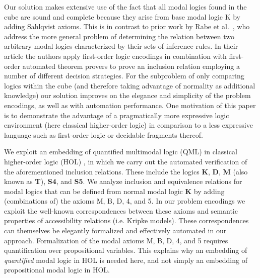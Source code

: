 \begin{isabellebody}
\begin{isamarkuptext}
Our solution makes extensive use of the fact that all modal logics found in the cube
are sound and complete because they arise from base modal logic K by adding Sahlqvist axioms.
This is in contrast to prior work by Rabe et al.~\cite{Rabe}, who address the more general problem of determining the
relation between two arbitrary modal logics characterized by their sets of inference
rules. In their article the authors apply first-order logic encodings in combination with first-order
automated theorem provers to prove an inclusion relation employing a number of different decision strategies.
For the subproblem of only comparing logics within the cube (and therefore taking advantage of normality as additional knowledge)
our solution improves on the elegance and simplicity of the problem encodings, as well as with automation performance.
One motivation of this paper is to demonstrate the advantage of a pragmatically more expressive logic
environment (here classical higher-order logic) in comparison to a less expressive language such as
first-order logic or decidable fragments thereof.

We exploit an embedding of quantified multimodal
logic (QML) in classical higher-order logic (HOL) \cite{J23}, in which we carry out the
automated verification of the aforementioned inclusion relations. These include the logics \textbf{K}, \textbf{D},
\textbf{M} (also known as \textbf{T}), \textbf{S4}, and
\textbf{S5}. We analyze inclusion and equivalence
relations for modal logics that can be defined from normal modal logic
\textbf{K} by adding (combinations of) the axioms M, B, D, 4, and
5. In our problem encodings we exploit the well-known correspondences
between these axioms and semantic properties of accessibility
relations (i.e. Kripke models). These correspondences can themselves be elegantly formalized
and effectively automated in our approach. Formalization of the modal
axioms M, B, D, 4, and 5 requires quantification over propositional
variables. This explains why an embedding of \textit{quantified} modal
logic in HOL is needed here, and not simply an embedding of propositional
modal logic in HOL.



\end{isamarkuptext}
\end{isabellebody}
